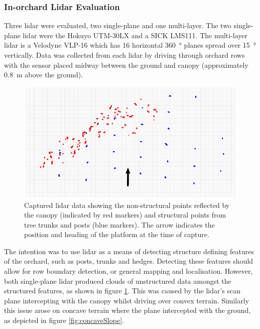 \documentclass[preprint,authoryear,12pt]{elsarticle}
\begin{document}
    \subsubsection{In-orchard Lidar Evaluation}
        Three lidar were evaluated, two single-plane and one multi-layer.
        The two single-plane lidar were the Hokuyo UTM-30LX and a SICK LMS111.
        The multi-layer lidar is a Velodyne VLP-16 which has 16 horizontal \SI{360}{\degree} planes spread over \SI{15}{\degree} vertically.
        Data was collected from each lidar by driving through orchard rows with the sensor placed midway between the ground and canopy (approximately \SI{0.8}{\meter} above the ground).

        \begin{figure}[htb]
            \centering
            \includegraphics[width=\linewidth]{imgs/canopy_data/canopy_data.pdf}
            \caption{
                Captured lidar data showing the non-structural points reflected by the canopy (indicated by red markers) and structural points from tree trunks and posts (blue markers).
                The arrow indicates the position and heading of the platform at the time of capture.
            }
            \label{fig:canopyDataCloud}
        \end{figure}

        The intention was to use lidar as a means of detecting structure defining features of the orchard, such as posts, trunks and hedges.
        Detecting these features should allow for row boundary detection, or general mapping and localisation.
        However, both single-plane lidar produced clouds of unstructured data amongst the structured features, as shown in figure \ref{fig:canopyDataCloud}.
        This was caused by the lidar's scan plane intercepting with the canopy whilst driving over convex terrain.
        Similarly this issue arose on concave terrain where the plane intercepted with the ground, as depicted in figure \ref{fig:concaveSlope}.
\end{document}
